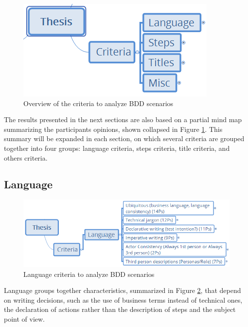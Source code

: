 \begin{figure}[h]
	\centering
	\includegraphics[scale=0.8]{images/overview_criteria}
	\caption[\hspace{2mm}Overview of the criteria to analyze BDD scenarios]{Overview of the criteria to analyze BDD scenarios}
	\label{fig:overview_criteria}
\end{figure}

The results presented in the next sections are also based on a partial mind map summarizing the participants opinions, shown collapsed in Figure \ref{fig:overview_criteria}. This summary will be expanded in each section, on which several criteria are grouped together into four groups: language criteria, steps criteria, title criteria, and others criteria. 

\subsection{Language}

\begin{figure}[t]
	\centering
	\includegraphics[scale=0.8]{images/language_criteria}
	\caption[\hspace{2mm}Language criteria to analyze BDD scenarios]{Language criteria to analyze BDD scenarios}
	\label{fig:language_criteria}
\end{figure}

Language groups together characteristics, summarized in Figure \ref{fig:language_criteria}, that depend on writing decisions, such as the use of business terms instead of technical ones, the declaration of actions rather than the description of steps and the subject point of view.


